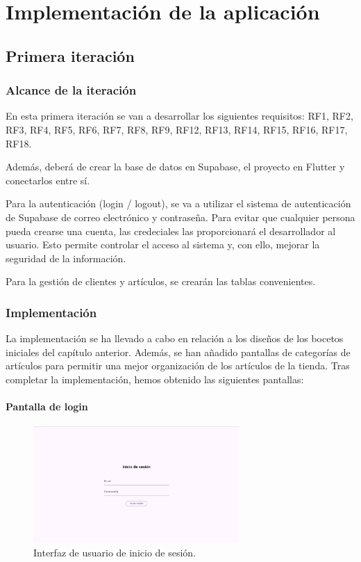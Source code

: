 \chapter{Implementación de la aplicación}
\label{chap:appvalidation}

\section{Primera iteración}

\subsection{Alcance de la iteración}

En esta primera iteración se van a desarrollar los siguientes requisitos: RF1, RF2, RF3, RF4, RF5, RF6, RF7, RF8, RF9, RF12, RF13, RF14, RF15, RF16, RF17, RF18. 

Además, deberá de crear la base de datos en Supabase, el proyecto en Flutter y conectarlos entre sí. 

Para la autenticación  (login / logout), se va a utilizar el sistema de autenticación de Supabase de correo electrónico y contraseña. Para evitar que cualquier persona pueda crearse una cuenta, las credeciales las proporcionará el desarrollador al usuario. Esto permite controlar el acceso al sistema y, con ello, mejorar la seguridad de la información. 

Para la gestión de clientes y artículos, se crearán las tablas convenientes. 

\subsection{Implementación}

La implementación se ha llevado a cabo en relación a los diseños de los bocetos iniciales del capítulo anterior. Además, se han añadido pantallas de categorías de artículos para permitir una mejor organización de los artículos de la tienda. Tras completar la implementación, hemos obtenido las siguientes pantallas: 

\subsubsection{Pantalla de login}

\begin{figure}[H]
	\centering
	\includegraphics[width=0.7\textwidth]{imagenes/PrimeraIteracion/inicioSesion.png}
	\caption{Interfaz de usuario de inicio de sesión.}
	\label{fig:appInicioSesion}
\end{figure}

